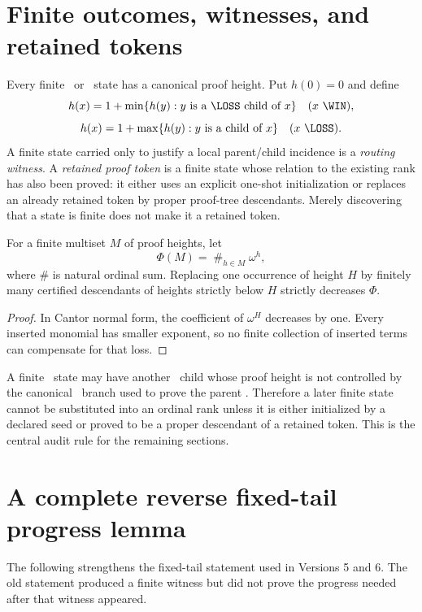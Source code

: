 \section{Finite outcomes, witnesses, and retained tokens}

Every finite \WIN\ or \LOSS\ state has a canonical proof height.  Put
$h(0)=0$ and define
\[
 h(x)=1+\min\{h(y):y\text{ is a \LOSS\ child of }x\}
 \quad(x\text{ \WIN}),
\]
\[
 h(x)=1+\max\{h(y):y\text{ is a child of }x\}
 \quad(x\text{ \LOSS}).
\]
A finite state carried only to justify a local parent/child incidence is a
\emph{routing witness}.  A \emph{retained proof token} is a finite state
whose relation to the existing rank has also been proved: it either uses an
explicit one-shot initialization or replaces an already retained token by
proper proof-tree descendants.  Merely discovering that a state is finite
does not make it a retained token.

\begin{lemma}\label{lem:token-rank}
For a finite multiset $M$ of proof heights, let
\[
  \Phi(M)=\mathop{\#}_{h\in M}\omega^h,
\]
where $\#$ is natural ordinal sum.  Replacing one occurrence of height $H$
by finitely many certified descendants of heights strictly below $H$
strictly decreases $\Phi$.
\end{lemma}

\begin{proof}
In Cantor normal form, the coefficient of $\omega^H$ decreases by one.
Every inserted monomial has smaller exponent, so no finite collection of
inserted terms can compensate for that loss.
\end{proof}

\begin{remark}
A finite \WIN\ state may have another \WIN\ child whose proof height is
not controlled by the canonical \LOSS\ branch used to prove the parent
\WIN.  Therefore a later finite state cannot be substituted into an
ordinal rank unless it is either initialized by a declared seed or proved to
be a proper descendant of a retained token.  This is the central audit rule
for the remaining sections.
\end{remark}

\section{A complete reverse fixed-tail progress lemma}

The following strengthens the fixed-tail statement used in Versions 5 and
6.  The old statement produced a finite witness but did not prove the
progress needed after that witness appeared.

